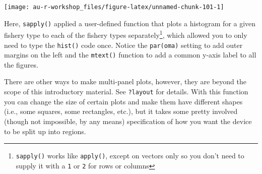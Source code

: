 \documentclass[]{book}
\newenvironment{Shaded}{\begin{snugshade}}{\end{snugshade}}
\newcommand{\KeywordTok}[1]{\textcolor[rgb]{0.13,0.29,0.53}{\textbf{#1}}}
\newcommand{\DataTypeTok}[1]{\textcolor[rgb]{0.13,0.29,0.53}{#1}}
\newcommand{\DecValTok}[1]{\textcolor[rgb]{0.00,0.00,0.81}{#1}}
\newcommand{\FloatTok}[1]{\textcolor[rgb]{0.00,0.00,0.81}{#1}}
\newcommand{\StringTok}[1]{\textcolor[rgb]{0.31,0.60,0.02}{#1}}
\newcommand{\ControlFlowTok}[1]{\textcolor[rgb]{0.13,0.29,0.53}{\textbf{#1}}}
\newcommand{\OperatorTok}[1]{\textcolor[rgb]{0.81,0.36,0.00}{\textbf{#1}}}
\newcommand{\NormalTok}[1]{#1}
\let\rmarkdownfootnote\footnote%
\def\footnote{\protect\rmarkdownfootnote}
\theoremstyle{definition}
\theoremstyle{definition}
\theoremstyle{definition}
\theoremstyle{remark}
\begin{document}
\begin{Shaded}
\end{Shaded}

\begin{center}\texttt{[image: au-r-workshop\_files/figure-latex/unnamed-chunk-101-1]} \end{center}

Here, \texttt{sapply()} applied a user-defined function that plots a
histogram for a given fishery type to each of the fishery types
separately\footnote{\texttt{sapply()} works like \texttt{apply()},
  except on vectors only so you don't need to supply it with a
  \texttt{1} or \texttt{2} for rows or columns}, which allowed you to
only need to type the \texttt{hist()} code once. Notice the
\texttt{par(oma)} setting to add outer margins on the left and the
\texttt{mtext()} function to add a common y-axis label to all the
figures.

There are other ways to make multi-panel plots, however, they are beyond
the scope of this introductory material. See \texttt{?layout} for
details. With this function you can change the size of certain plots and
make them have different shapes (i.e., some squares, some rectangles,
etc.), but it takes some pretty involved (though not impossible, by any
means) specification of how you want the device to be split up into
regions.
\end{document}
